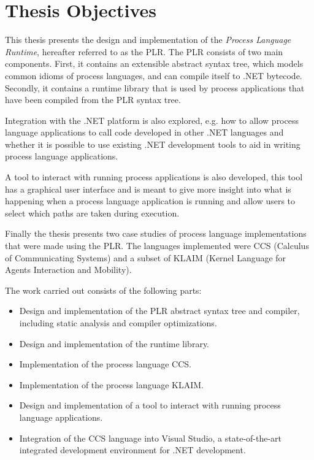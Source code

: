 \section{Thesis Objectives}

	This thesis presents the design and implementation of the \textit{Process 
	Language Runtime}, hereafter referred to as the PLR. The PLR consists of two 
	main components. First, it contains an extensible abstract syntax tree, 
	which models common idioms of process languages, and can compile itself to 
	.NET bytecode. Secondly, it contains a runtime library that is used by 
	process applications that have been compiled from the PLR syntax tree. 

	Integration with the .NET platform is also explored, e.g. how to allow 
	process language applications to call code developed in other .NET languages 
	and whether it is possible to use existing .NET development tools to aid in 
	writing process language applications. 
	
	A tool to interact with running process applications is also developed, this 
	tool has a graphical user interface and is meant to give more insight into 
	what is happening when a process language application is running and allow 
	users to select which paths are taken during execution.

	Finally the thesis presents two case studies of process language 
	implementations that were made using the PLR. The languages implemented were 
	CCS (Calculus of Communicating Systems) and a subset of KLAIM (Kernel 
	Language for Agents Interaction and Mobility).

	\newpage
	The work carried out consists of the following parts:

	\begin{itemize}
  	\item Design and implementation of the PLR abstract syntax tree and 
  				compiler, including static analysis and compiler optimizations.
  	\item Design and implementation of the runtime library.
  	\item Implementation of the process language CCS.
  	\item Implementation of the process language KLAIM.
  	\item Design and implementation of a tool to interact with running process 
  	language applications.
  	\item Integration of the CCS language into Visual Studio, a 
  				state-of-the-art integrated development environment for .NET 
  				development.
	\end{itemize}


